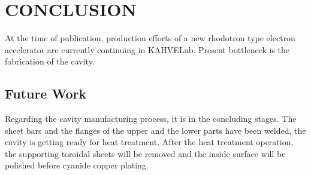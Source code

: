 \documentclass[a4paper,oneside,12pt]{report}
\numberwithin{equation}{chapter}
\begin{document}


\tableofcontents


\newcommand{\vecthreeBF}[1]{\vec{\textbf{#1}}}
\newcommand{\vecthree}[1]{\vec{#1}}

\newcommand{\parDeriv}[2]{\frac{\partial #1}{\partial #2}}
\newcommand{\parDerivS}[2]{\frac{\partial^2 #1}{\partial #2^2}}
\newcommand{\derivS}[2]{\frac{d^2 #1}{d#2^2}}

\newcommand{\dotProdBF}[2]{\vecthreeBF{#1} \cdot \vecthreeBF{#2}}
\newcommand{\dotProd}[2]{\vecthree{#1} \cdot \vecthree{#2}}

\newcommand{\crossProdBF}[2]{\vecthreeBF{#1} \times \vecthreeBF{#2}}
\newcommand{\crossProd}[2]{\vecthree{#1} \times \vecthree{#2}}


\newcommand{\fromeq}[1]{\textit{equation \ref{eq:#1}}}
\newcommand{\fromeqs}[2]{\textit{equations \ref{eq:#1} and \ref{eq:#2}}}
\newcommand{\fromeqsth}[3]{\textit{equations \ref{eq:#1}, \ref{eq:#2} and \ref{eq:#3}}}

\newcommand{\fromfig}[1]{\textit{figure \ref{fig:#1}}}
\newcommand{\fromfigs}[2]{\textit{figures \ref{fig:#1} and \ref{fig:#2}}}

\newcommand{\fromsec}[1]{\textit{section \ref{sec:#1}}}
\newcommand{\fromsecs}[2]{\textit{sections \ref{sec:#1} and \ref{sec:#2}}}

\newcommand{\e}{$\textbf{e}^-$ }
\newcommand{\egun}{$\textbf{e}^-$-gun }
\newcommand{\eB}{$\textbf{e}^-$ - $\vecthreeBF{B}$ }
\newcommand{\eE}{$\textbf{e}^-$ - $\vecthreeBF{E}$ }
\newcommand{\eEM}{$\textbf{e}^-$ - \textbf{EM} }
\newcommand{\ee}{$\textbf{e}^-$ - $\textbf{e}^-$ }

\chapter{CONCLUSION}
At the time of publication, production efforts of a new rhodotron type electron accelerator are currently continuing in KAHVELab. 
Present bottleneck is the fabrication of the cavity.

\section{Future Work}
Regarding the cavity manufacturing process, it is in the concluding stages.
The sheet bars and the flanges of the upper and the lower parts have been welded, the cavity is getting ready for heat treatment.
After the heat treatment operation, the supporting toroidal sheets will be removed and the inside surface will be polished before cyanide copper plating. 
\end{document}
